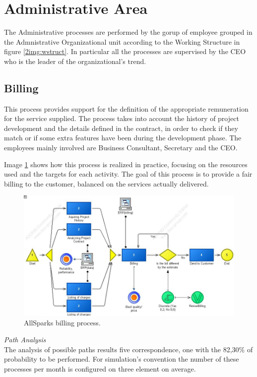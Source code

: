 \section{Administrative Area}
The Administrative processes are performed by the gorup of employee grouped in the Admnistrative Organizational unit according to the Working Structure in figure \ref{2img:wstruct}. In particular all the processes are supervised by the CEO who is the leader of the organizational's trend.


\subsection{Billing}
This process provides support for the definition of the appropriate
remuneration for the service supplied.
The process takes into account the history of project development and the details defined in the contract, in order to check if they match or if some extra features have been during the development phase. The employees mainly involved are Business Consultant, Secretary and the CEO.

Image \ref{2img:billing} shows how this process is realized in practice, focusing on the resources used and the targets for each activity. The goal of this process is to provide a fair billing to the customer, balanced on the services actually delivered.

\begin{figure}[ht!]
\begin{centering}
\includegraphics[scale=0.50, angle=90]{assign2/adonis/imgs/billing.jpg}
\caption{AllSparks billing process.}
\label{2img:billing}
\end{centering}
\end{figure}

\emph{Path Analysis}\\
The analysis of possible paths results five correspondence, one with the 82,30\% of probability to be performed. For simulation's convention the number of these processes per month is configured on three element on average.

